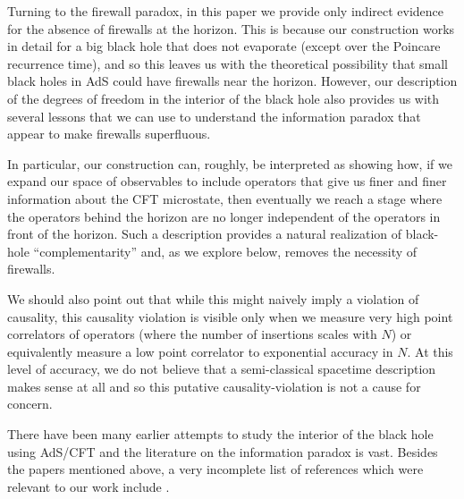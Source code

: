 Turning to the firewall paradox, in this paper we provide only indirect evidence for the absence of firewalls at the horizon. This is because our construction works in detail for a big black hole that does not evaporate (except over the Poincare recurrence time), and so this leaves us with the theoretical possibility that small black holes in AdS could have firewalls near the horizon. However, our description of the degrees of freedom in the interior of the black hole also provides us with several lessons that we can use to understand the information paradox that appear to make firewalls superfluous. 

In particular, our construction can, roughly, be interpreted as showing how, if we expand our space of observables to include operators that give us finer and finer information about the CFT microstate, then eventually we reach a stage where the operators behind the horizon are no longer independent of 
the operators in front of the horizon. Such a description provides a natural realization of black-hole ``complementarity'' \cite{'tHooft:1990fr,Susskind:1993if} and, as we explore below, removes the necessity of firewalls. 


We should also point out that while this might naively imply a violation of causality, this causality violation is visible only when we measure very high point correlators of operators (where the number of insertions scales with $N$) or equivalently measure a low point correlator to exponential accuracy in $N$. At this level of accuracy, we do not believe that a semi-classical spacetime description makes sense at all and so this putative causality-violation is not a cause for concern.

There have been many earlier attempts to study the interior of the black hole using AdS/CFT and the literature on the information paradox is vast. Besides the papers  mentioned above, a very incomplete list of references which were relevant to our work include  \cite{Kiem:1995iy,Balasubramanian:1999zv,Giddings:2001pt,Maldacena:2001kr,Hubeny:2002dg,Kraus:2002iv,Levi:2003cx,Fidkowski:2003nf,Barbon:2003aq,Kaplan:2004qe,Balasubramanian:2004zu,Festuccia:2005pi,Balasubramanian:2005mg,
Balasubramanian:2005qu,Festuccia:2006sa,Balasubramanian:2007qv,Marolf:2008mf,Balasubramanian:2008da,deBoer:2009un,Horowitz:2009wm,Balasubramanian:2011dm,Avery:2011nb,Simon:2011zza}. 

